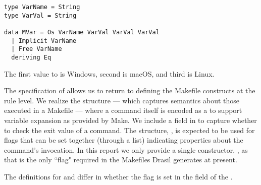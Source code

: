 {{{{{\begin{tcolorbox}
\begin{verbatim}
type VarName = String
type VarVal = String

data MVar = Os VarName VarVal VarVal VarVal
  | Implicit VarName
  | Free VarName
  deriving Eq
\end{verbatim}
\end{tcolorbox}

The first value to  is Windows, second is macOS, and third is Linux. 

% 
% 
% 
% 


The specification of  allows us to return to defining the Makefile constructs at the rule level. We realize the  structure --- which captures semantics about those executed in a Makefile --- where a command itself is encoded as a  to support variable expansion as provided by Make. We include a field in  to capture whether to check the exit value of a command. The structure, , is expected to be used for flags that can be set together (through a list) indicating properties about the command's invocation. In this report we only provide a single constructor, , as that is the only ``flag" required in the Makefiles Drasil generates at present.

%

The definitions for  and  differ in whether the  flag is set in the  field of the . 

}}}}}

